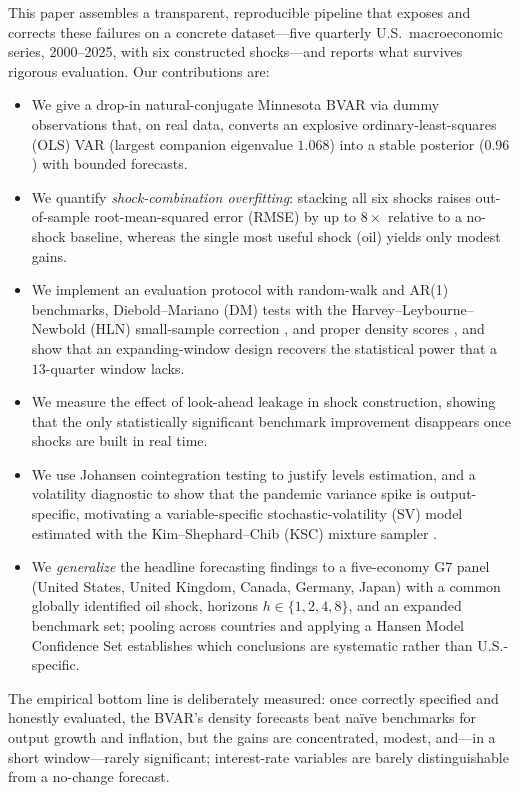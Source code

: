 \documentclass[conference]{IEEEtran}
\begin{document}
This paper assembles a transparent, reproducible pipeline that exposes and
corrects these failures on a concrete dataset---five quarterly U.S.\
macroeconomic series, 2000--2025, with six constructed shocks---and reports
what survives rigorous evaluation. Our contributions are:
\begin{itemize}
\item We give a drop-in natural-conjugate Minnesota BVAR via dummy observations
\cite{bgr2010,sims1998} that, on real data, converts an explosive
ordinary-least-squares (OLS) VAR (largest companion eigenvalue $1.068$) into a
stable posterior ($0.96$) with bounded forecasts.
\item We quantify \emph{shock-combination overfitting}: stacking all six shocks
raises out-of-sample root-mean-squared error (RMSE) by up to $8\times$ relative
to a no-shock baseline, whereas the single most useful shock (oil) yields only
modest gains.
\item We implement an evaluation protocol with random-walk and AR(1) benchmarks,
Diebold--Mariano (DM) tests with the Harvey--Leybourne--Newbold (HLN)
small-sample correction \cite{dm1995,hln1997}, and proper density scores
\cite{gneiting2007}, and show that an expanding-window design recovers the
statistical power that a $13$-quarter window lacks.
\item We measure the effect of look-ahead leakage in shock construction, showing
that the only statistically significant benchmark improvement disappears once
shocks are built in real time.
\item We use Johansen cointegration testing to justify levels estimation, and a
volatility diagnostic to show that the pandemic variance spike is
output-specific, motivating a variable-specific stochastic-volatility (SV) model
estimated with the Kim--Shephard--Chib (KSC) mixture sampler
\cite{primiceri2005,ksc1998}.
\item We \emph{generalize} the headline forecasting findings to a five-economy
G7 panel (United States, United Kingdom, Canada, Germany, Japan) with a common
globally identified oil shock, horizons $h\in\{1,2,4,8\}$, and an expanded
benchmark set; pooling across countries and applying a Hansen Model Confidence
Set \cite{hansen2011} establishes which conclusions are systematic rather than
U.S.-specific.
\end{itemize}

The empirical bottom line is deliberately measured: once correctly specified and
honestly evaluated, the BVAR's density forecasts beat na\"ive benchmarks for
output growth and inflation, but the gains are concentrated, modest, and---in a
short window---rarely significant; interest-rate variables are barely
distinguishable from a no-change forecast.
\end{document}
